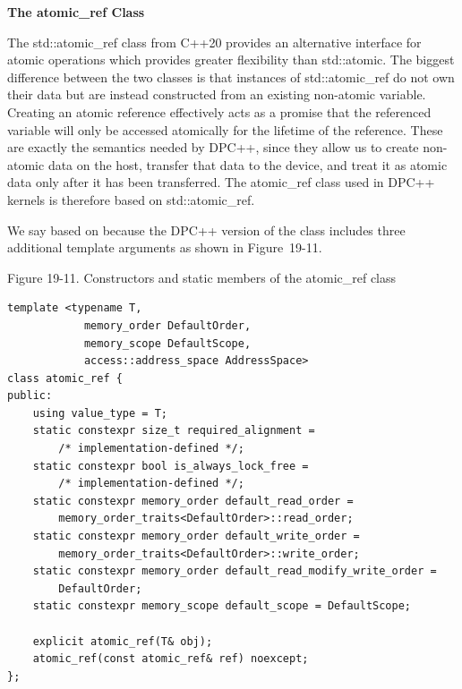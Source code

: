 \hspace*{\fill} \par %
\textbf{The atomic\_ref Class}

The std::atomic\_ref class from C++20 provides an alternative interface for atomic operations which provides greater flexibility than std::atomic. The biggest difference between the two classes is that instances of std::atomic\_ref do not own their data but are instead constructed from an existing non-atomic variable. Creating an atomic reference effectively acts as a promise that the referenced variable will only be accessed atomically for the lifetime of the reference. These are exactly the semantics needed by DPC++, since they allow us to create non-atomic data on the host, transfer that data to the device, and treat it as atomic data only after it has been transferred. The atomic\_ref class used in DPC++ kernels is therefore based on std::atomic\_ref.\par

We say based on because the DPC++ version of the class includes three additional template arguments as shown in Figure 19-11.\par

\hspace*{\fill} \par %
Figure 19-11. Constructors and static members of the atomic\_ref class
\begin{lstlisting}[caption={}]
template <typename T,
			memory_order DefaultOrder,
			memory_scope DefaultScope, 
			access::address_space AddressSpace>
class atomic_ref {
public:
	using value_type = T;
	static constexpr size_t required_alignment =
		/* implementation-defined */;
	static constexpr bool is_always_lock_free =
		/* implementation-defined */;
	static constexpr memory_order default_read_order =
		memory_order_traits<DefaultOrder>::read_order;
	static constexpr memory_order default_write_order =
		memory_order_traits<DefaultOrder>::write_order;
	static constexpr memory_order default_read_modify_write_order =
		DefaultOrder;
	static constexpr memory_scope default_scope = DefaultScope;
	
	explicit atomic_ref(T& obj);
	atomic_ref(const atomic_ref& ref) noexcept;
};
\end{lstlisting}

